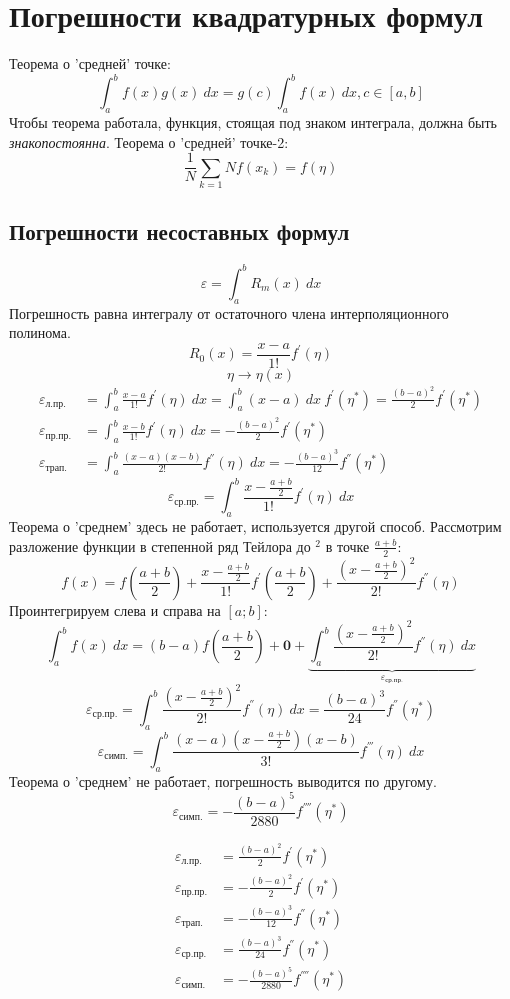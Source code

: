 \documentclass[a4paper,11pt]{article}
\begin{document}
\section{Погрешности квадратурных формул}
Теорема о 'средней' точке:
\[\int_a^b f(x)g(x)\ dx = g(c) \int_a^b f(x)\ dx, c \in [a, b]\]
Чтобы теорема работала, функция, стоящая под знаком интеграла, должна быть \textit{знакопостоянна}.
Теорема о 'средней' точке-2:
\[\frac{1}{N}\sum_{k=1}{N}f(x_k) = f(\eta)\]

  \subsection{Погрешности несоставных формул}
  \[\varepsilon = \int_a^b R_m(x)\ dx\]
  Погрешность равна интегралу от остаточного члена интерполяционного полинома.
  \[R_0(x) = \frac{x-a}{1!}f^{'}(\eta)\]
  \marginpar
  {
    \vspace{3mm}
    \footnotesize
    \[\eta  \rightarrow \eta(x)\]
  }
  \begin{align*}
    \varepsilon_{\text{л.пр.}}  &= \int_a^b \frac{x-a}{1!} f^{'}(\eta)\ dx = \int_a^b (x-a)\ dx\ f^{'}(\eta^*) = \frac{(b-a)^2}{2}f^{'}(\eta^*) \\
    \varepsilon_{\text{пр.пр.}} &= \int_a^b \frac{x-b}{1!} f^{'}(\eta)\ dx = - \frac{(b-a)^2}{2}f^{'}(\eta^*) \\
    \varepsilon_{\text{трап.}}  &= \int_a^b \frac{(x-a)(x-b)}{2!} f^{''}(\eta)\ dx = - \frac{(b-a)^3}{12}f^{''}(\eta^*)
  \end{align*}
  \newpage
  \[\varepsilon_{\text{ср.пр.}} = \int_a^b \frac{x-\frac{a+b}{2}}{1!} f^{'}(\eta)\ dx\]
  Теорема о 'среднем' здесь не работает, используется другой способ.
  Рассмотрим разложение функции в степенной ряд Тейлора до $^2$  в точке $\frac{a+b}{2}$:
  \[f(x) = f(\frac{a+b}{2}) + \frac{x-\frac{a+b}{2}}{1!} f^{'}(\frac{a+b}{2}) + \frac{(x-\frac{a+b}{2})^2}{2!} f^{''}(\eta)\]
  Проинтегрируем слева и справа на $[a; b]$:
  \[\int_a^b f(x)\ dx = (b-a)f(\frac{a+b}{2}) + \textbf{0} + \underbrace{\int_a^b \frac{(x-\frac{a+b}{2})^2}{2!} f^{''}(\eta)\ dx}_{\varepsilon_{\text{ср.пр.}}}\]
  \[\varepsilon_{\text{ср.пр.}} = \int_a^b \frac{(x-\frac{a+b}{2})^2}{2!} f^{''}(\eta)\ dx = \frac{(b-a)^3}{24}f^{''}(\eta^*)\]
  \[\varepsilon_{\text{симп.}} = \int_a^b \frac{(x-a)(x-\frac{a+b}{2})(x-b)}{3!} f^{'''}(\eta)\ dx\]
  Теорема о 'среднем' не работает, погрешность выводится по другому.
  \[\varepsilon_{\text{симп.}} = - \frac{(b-a)^5}{2880} f^{''''}(\eta^*)\]
  \begin{importantblock}
    \begin{align*}
      \varepsilon_{\text{л.пр.}}  &= \frac{(b-a)^2}{2}f^{'}(\eta^*) \\
      \varepsilon_{\text{пр.пр.}} &= - \frac{(b-a)^2}{2}f^{'}(\eta^*) \\
      \varepsilon_{\text{трап.}}  &= - \frac{(b-a)^3}{12}f^{''}(\eta^*) \\
      \varepsilon_{\text{ср.пр.}} &= \frac{(b-a)^3}{24}f^{''}(\eta^*) \\
      \varepsilon_{\text{симп.}}  &= - \frac{(b-a)^5}{2880} f^{''''}(\eta^*)
    \end{align*}
  \end{importantblock}
\end{document}
